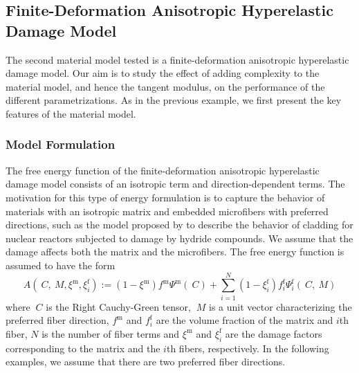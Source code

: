 \documentclass[12pt]{article}
\newcommand{\mtrx}{{\text{m}}}
\newcommand{\fiber}{{\text{f}}}
\numberwithin{equation}{section}
\begin{document}
\subsection{Finite-Deformation Anisotropic Hyperelastic Damage Model}
\label{subsec:anisotropic}

The second material model tested is a finite-deformation anisotropic
hyperelastic damage model. Our aim is to study the effect of adding
complexity to the material model, and hence the tangent modulus, on
the performance of the different parametrizations. As in the previous
example, we first present the key features of the material model.

\subsubsection{Model Formulation}

The free energy function of the finite-deformation anisotropic
hyperelastic damage model consists of an isotropic term and
direction-dependent terms. The motivation for this type of energy
formulation is to capture the behavior of materials with an isotropic
matrix and embedded microfibers with preferred directions, such as the
model proposed by \citet{Chen.etal:2014} to describe the behavior of
cladding for nuclear reactors subjected to damage by hydride
compounds. We assume that the damage affects both the matrix and the
microfibers. The free energy function is assumed to have the form
\begin{equation}\label{eq:aniso_energy}
  A(~C, ~M, \xi^\mtrx, \xi^\fiber_i)
  :=
  (1-\xi^\mtrx) f^\mtrx \Psi^\mtrx(~C)
  + \sum_{i=1}^{N} (1-\xi^\fiber_i) f^\fiber_i \Psi^\fiber_i(~C, ~M)
\end{equation}
where $~C$ is the Right Cauchy-Green tensor, $~M$ is a unit vector
characterizing the preferred fiber direction, $f^\mtrx$ and
$f^\fiber_i$ are the volume fraction of the matrix and $i$th fiber,
$N$ is the number of fiber terms and $\xi^\mtrx$ and $\xi^\fiber_i$
are the damage factors corresponding to the matrix and the $i$th
fibers, respectively. In the following examples, we assume that there
are two preferred fiber directions.
\end{document}
